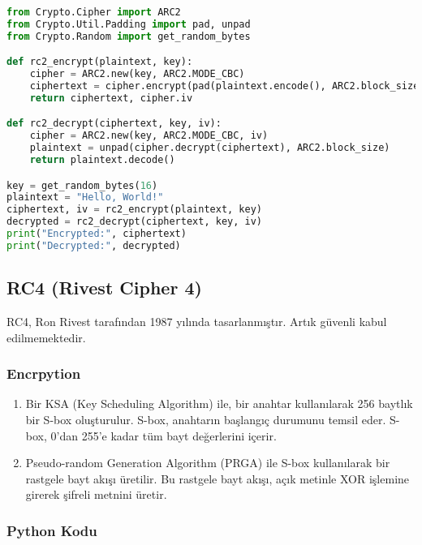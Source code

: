 \begin{lstlisting}[language=Python]
from Crypto.Cipher import ARC2
from Crypto.Util.Padding import pad, unpad
from Crypto.Random import get_random_bytes

def rc2_encrypt(plaintext, key):
    cipher = ARC2.new(key, ARC2.MODE_CBC)
    ciphertext = cipher.encrypt(pad(plaintext.encode(), ARC2.block_size))
    return ciphertext, cipher.iv

def rc2_decrypt(ciphertext, key, iv):
    cipher = ARC2.new(key, ARC2.MODE_CBC, iv)
    plaintext = unpad(cipher.decrypt(ciphertext), ARC2.block_size)
    return plaintext.decode()

key = get_random_bytes(16)
plaintext = "Hello, World!"
ciphertext, iv = rc2_encrypt(plaintext, key)
decrypted = rc2_decrypt(ciphertext, key, iv)
print("Encrypted:", ciphertext)
print("Decrypted:", decrypted)
\end{lstlisting}

\newpage

\subsection{RC4 (Rivest Cipher 4)}

RC4, Ron Rivest tarafından 1987 yılında tasarlanmıştır. Artık güvenli kabul edilmemektedir.

\subsubsection{Encrpytion}

\begin{enumerate}
    \item Bir KSA (Key Scheduling Algorithm) ile, bir anahtar kullanılarak 256 baytlık bir S-box oluşturulur. S-box, anahtarın başlangıç durumunu temsil eder. S-box, 0'dan 255'e kadar tüm bayt değerlerini içerir.
    \item Pseudo-random Generation Algorithm (PRGA) ile S-box kullanılarak bir rastgele bayt akışı üretilir. Bu rastgele bayt akışı, açık metinle XOR işlemine girerek şifreli metnini üretir.
\end{enumerate}

\subsubsection{Python Kodu}

